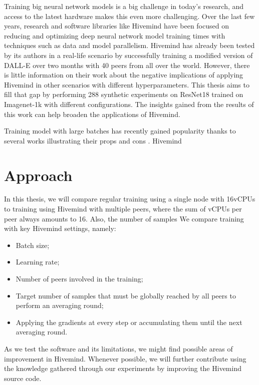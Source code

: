 Training big neural network models is a big challenge in today's research, and access to the latest hardware makes this even more challenging.
Over the last few years, research and software libraries like Hivemind have been focused on reducing and optimizing deep neural network model training times with techniques such as data and model parallelism.
Hivemind has already been tested by its authors in a real-life scenario by successfully training a modified version of DALL-E over two months with 40 peers from all over the world.
However, there is little information on their work about the negative implications of applying Hivemind in other scenarios with different hyperparameters.
This thesis aims to fill that gap by performing 288 synthetic experiments on ResNet18 trained on Imagenet-1k with different configurations.
The insights gained from the results of this work can help broaden the applications of Hivemind.

Training model with large batches has recently gained popularity thanks to several works illustrating their props and cons \cite{DBLP:journals/corr/KeskarMNST16, you2017scaling, DBLP:journals/corr/abs-1904-00962}.
Hivemind

\section{Approach}

In this thesis, we will compare regular training using a single node with 16vCPUs to training using Hivemind with multiple peers, where the sum of vCPUs per peer always amounts to 16.
Also, the number of samples
We compare training with key Hivemind settings, namely:
\begin{itemize}
    \item Batch size;
    \item Learning rate;
    \item Number of peers involved in the training;
    \item Target number of samples that must be globally reached by all peers to perform an averaging round;
    \item Applying the gradients at every step or accumulating them until the next averaging round.
\end{itemize}

As we test the software and its limitations, we might find possible areas of improvement in Hivemind.
Whenever possible, we will further contribute using the knowledge gathered through our experiments by improving the Hivemind \cite{hivemind} source code.

